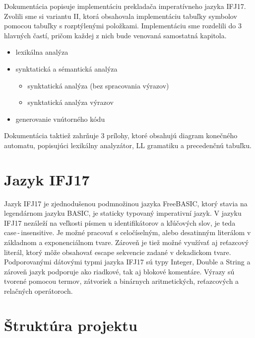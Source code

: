 \documentclass[11pt,a4paper]{article}
\begin{document}
Dokumentácia popisuje implementáciu prekladača imperatívneho jazyka IFJ17. Zvolili sme si variantu II, ktorá obsahovala implementáciu tabuľky symbolov pomocou tabuľky s rozptýlenými položkami. Implementáciu sme rozdelili do 3 hlavných častí, pričom každej z nich bude venovaná samostatná kapitola.
\begin{itemize}
	\item lexikálna analýza
	\item synktatická a sémantická analýza
		\begin{itemize}
			\item synktatická analýza (bez spracovania výrazov)
			\item synktatická analýza výrazov
		\end{itemize}
	\item generovanie vnútorného kódu
\end{itemize}
Dokumentácia taktiež zahrňuje 3 prílohy, ktoré obsahujú diagram konečného automatu, popisujúci lexikálny analyzátor, LL gramatiku a precedenčnú tabuľku.

\section{Jazyk IFJ17}
Jazyk IFJ17 je zjednodušenou podmnožinou jazyka FreeBASIC, ktorý stavia na legendárnom jazyku BASIC, je staticky typovaný
imperativní jazyk. V jazyku IFJ17 nezáleží na veľkosti písmen u identifikátorov a kľúčových slov, je teda case\,-\,insensitive.
Je možné pracovať s celočíselným, alebo desatinným literálom v základnom a exponenciálnom tvare. Zároveň je tiež možné využívať aj reťazcový literál, ktorý môže obsahovať escape sekvencie zadané v dekadickom tvare. Podporovanými dátovými typmi jazyka IFJ17 sú typy Integer, Double a String a zároveň jazyk podporuje ako riadkové, tak aj blokové komentáre. Výrazy sú tvorené pomocou termov, zátvoriek a binárnych aritmetických, reťazcových a relačných operátoroch. 


\section{Štruktúra projektu}
\end{document}
